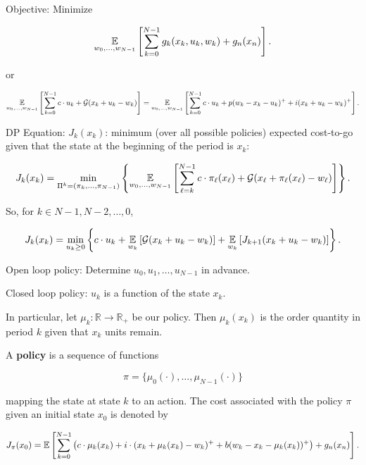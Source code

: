 \begin{example}
\begin{enumerate}
\end{enumerate}

Objective: Minimize

\[
\underset{w_0, \ldots, w_{N-1}}{\mathbb{E}} \left[  \sum_{k=0}^{N-1} g_k(x_k, u_k, w_k) + g_n(x_n)\right].
\]

or

\[
\underset{w_0, \ldots, w_{N-1}}{\mathbb{E}} \left[  \sum_{k=0}^{N-1} c \cdot u_k + \mathcal{G}(x_k + u_k - w_k)\right]  = \underset{w_0, \ldots, w_{N-1}}{\mathbb{E}} \left[  \sum_{k=0}^{N-1} c \cdot u_k + p (w_k -x _k - u_k)^+ + i (x_k + u_k - w_k)^+ \right] .
\]

DP Equation: \(J_k(x_k)\): minimum (over all possible policies) expected cost-to-go given that the state at the beginning of the period is \(x_k\):

\[
J_k(x_k) = \min_{\Pi^k = (\pi_k, \ldots, \pi_{N-1})} \left\{ \underset{w_0, \ldots, w_{N-1}}{\mathbb{E}} \left[  \sum_{\ell=k}^{N-1} c \cdot \pi_\ell(x_\ell) + \mathcal{G}(x_\ell +  \pi_\ell(x_\ell)  - w_\ell)\right]  \right\}.
\]



So, for \(k \in N-1, N-2, \ldots, 0\),

\[
J_k(x_k) = \min_{u_k \geq 0} \left\{ c \cdot u_k + \underset{w_k}{\mathbb{E}} \left[ \mathcal{G}(x_k + u_k - w_k) \right] +  \underset{w_k}{\mathbb{E}}  \left[J_{k+1}(x_k + u_k - w_k ) \right] \right\} .
\]


\end{example}

Open loop policy: Determine \(u_0, u_1, \ldots, u_{N-1}\) in advance. 

\begin{definition}
Closed loop policy: \(u_k\) is a function of the state \(x_k\). 
\end{definition}

In particular, let \(\mu_k: \mathbb{R} \to \mathbb{R}_+\) be our policy. Then \(\mu_k(x_k)\) is the order quantity in period \(k\) given that \(x_k\) units remain. 

\begin{definition}

A \textbf{policy} is a sequence of functions 

\[
\pi = \{\mu_0(\cdot), \ldots, \mu_{N-1}(\cdot)\}
\]

mapping the state at state \(k\) to an action. The cost associated with the policy \(\pi\) given an initial state \(x_0\) is denoted by 

\[
J_\pi(x_0) = \mathbb{E} \left[ \sum_{k=0}^{N-1} \left( c \cdot \mu_k(x_k) +  i \cdot (x_k +  \mu_k(x_k) - w_k)^+ + b(w_k - x_k -  \mu_k(x_k))^+ \right) + g_n(x_n) \right].
\]

\end{definition}

